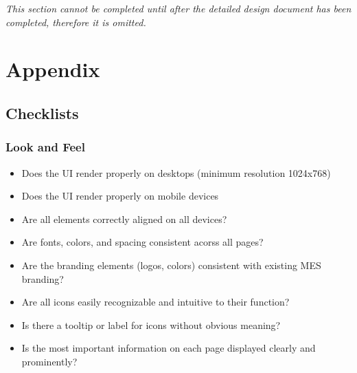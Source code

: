 \documentclass[12pt, titlepage]{article}
\begin{document}
\textit{This section cannot be completed until after the detailed design document has been completed, therefore it is omitted.}



\newpage

\section{Appendix}

\subsection{Checklists}


\hypertarget{checklist-nfr10}{}
\subsubsection{Look and Feel}

  \begin{itemize}[label=$\square$] %
    \item Does the UI render properly on desktops (minimum resolution 1024x768) 
    \item Does the UI render properly on mobile devices 
    \item Are all elements correctly aligned on all devices? 
    \item Are fonts, colors, and spacing consistent acorss all pages?
    \item Are the branding elements (logos, colors) consistent with existing MES branding?
    \item Are all icons easily recognizable and intuitive to their function?
    \item Is there a tooltip or label for icons without obvious meaning?
    \item Is the most important information on each page displayed clearly and prominently?
 \end{itemize}
\end{document}
